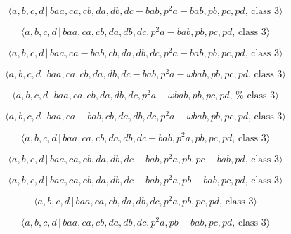 \documentclass[10pt]{article}
\begin{document}
\begin{equation}
\langle a,b,c,d\,|\,baa,ca,cb,da,db,dc-bab,p^2a-bab,pb,pc,pd,\,\text{class }%
3\rangle  \tag{7.3614}
\end{equation}

\begin{equation}
\langle a,b,c,d\,|\,baa,ca,cb,da,db,dc,p^2a-bab,pb,pc,pd,\,\text{class }%
3\rangle  \tag{7.3615}
\end{equation}

\begin{equation}
\langle a,b,c,d\,|\,baa,ca-bab,cb,da,db,dc,p^2a-bab,pb,pc,pd,\,\text{class }%
3\rangle  \tag{7.3616}
\end{equation}

\begin{equation}
\langle a,b,c,d\,|\,baa,ca,cb,da,db,dc-bab,p^{2}a-\omega bab,pb,pc,pd,\,%
\text{class }3\rangle  \tag{7.3617}
\end{equation}

\begin{equation}
\langle a,b,c,d\,|\,baa,ca,cb,da,db,dc,p^{2}a-\omega bab,pb,pc,pd,\,\text{%
class }3\rangle  \tag{7.3618}
\end{equation}

\begin{equation}
\langle a,b,c,d\,|\,baa,ca-bab,cb,da,db,dc,p^{2}a-\omega bab,pb,pc,pd,\,%
\text{class }3\rangle  \tag{7.3619}
\end{equation}

\begin{equation}
\langle a,b,c,d\,|\,baa,ca,cb,da,db,dc-bab,p^2a,pb,pc,pd,\,\text{class }%
3\rangle  \tag{7.3620}
\end{equation}

\begin{equation}
\langle a,b,c,d\,|\,baa,ca,cb,da,db,dc-bab,p^2a,pb,pc-bab,pd,\,\text{class }%
3\rangle  \tag{7.3621}
\end{equation}

\begin{equation}
\langle a,b,c,d\,|\,baa,ca,cb,da,db,dc-bab,p^2a,pb-bab,pc,pd,\,\text{class }%
3\rangle  \tag{7.3622}
\end{equation}

\begin{equation}
\langle a,b,c,d\,|\,baa,ca,cb,da,db,dc,p^2a,pb,pc,pd,\,\text{class }3\rangle
\tag{7.3623}
\end{equation}

\begin{equation}
\langle a,b,c,d\,|\,baa,ca,cb,da,db,dc,p^2a,pb-bab,pc,pd,\,\text{class }%
3\rangle  \tag{7.3624}
\end{equation}
\end{document}
